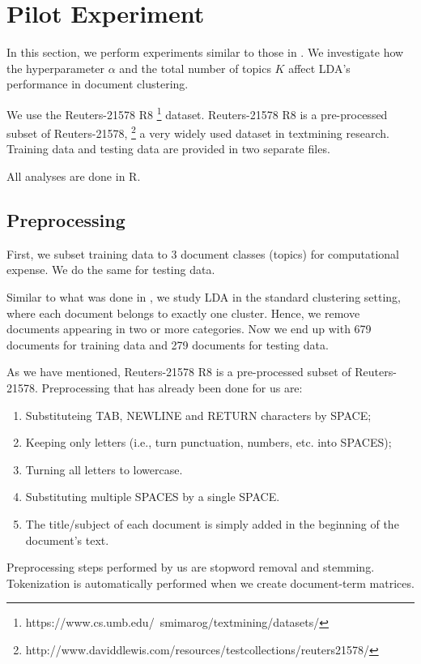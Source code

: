 \documentclass{article}
\begin{document}
\section{Pilot Experiment}

In this section, we perform experiments similar to those in \cite{lu2011investigating}. We investigate how the hyperparameter $\alpha$ and the total number of topics $K$ affect LDA's performance in document clustering.

We use the Reuters-21578 R8 \footnote{https://www.cs.umb.edu/~smimarog/textmining/datasets/} dataset. Reuters-21578 R8 is a pre-processed subset of Reuters-21578, \footnote{http://www.daviddlewis.com/resources/testcollections/reuters21578/} a very widely used dataset in textmining research. Training data and testing data are provided in two separate files.

All analyses are done in R.

\subsection{Preprocessing}

First, we subset training data to 3 document classes (topics) for computational expense. We do the same for testing data.

Similar to what was done in \cite{lu2011investigating}, we study LDA in the standard clustering setting, where each document belongs to exactly one cluster. Hence, we remove documents appearing in two or more categories. Now we end up with 679 documents for training data and 279 documents for testing data.

As we have mentioned, Reuters-21578 R8 is a pre-processed subset of Reuters-21578. Preprocessing that has already been done for us are:

\begin{enumerate}
  \item Substituteing TAB, NEWLINE and RETURN characters by SPACE;
  \item Keeping only letters (i.e., turn punctuation, numbers, etc. into SPACES);
  \item Turning all letters to lowercase.
  \item Substituting multiple SPACES by a single SPACE.
  \item The title/subject of each document is simply added in the beginning of the document's text.
\end{enumerate}

Preprocessing steps performed by us are stopword removal and stemming. Tokenization is automatically performed when we create document-term matrices.
\end{document}

